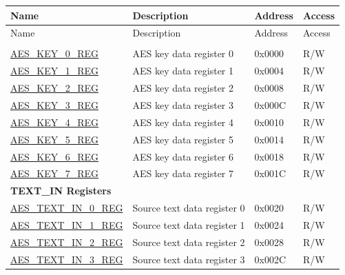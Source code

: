 \begin{longtable}{ | p{5.2cm} | p{6.6cm} | p{2cm} | p{1.2cm} | }
\hline\rowcolor{lightgray}
Name & Description &  Address & Access \\ \hline
\endfirsthead
        \hline
        \rowcolor{lightgray}
       Name & Description &  Address & Access  \\
        \hline
        \endhead
        \endfoot

\multicolumn{4}{|l|}{\textbf{Key Registers}} \\ \hline

\hyperref[regdesc:AESKEYnREG]{AES\_KEY\_0\_REG}				&	AES key data register 0				& 0x0000 & R/W \\ \hline
\hyperref[regdesc:AESKEYnREG]{AES\_KEY\_1\_REG}				&	AES key data register 1				& 0x0004 & R/W \\ \hline
\hyperref[regdesc:AESKEYnREG]{AES\_KEY\_2\_REG}				&	AES key data register 2				& 0x0008 & R/W \\ \hline
\hyperref[regdesc:AESKEYnREG]{AES\_KEY\_3\_REG}				&	AES key data register 3				& 0x000C & R/W \\ \hline
\hyperref[regdesc:AESKEYnREG]{AES\_KEY\_4\_REG}				&	AES key data register 4				& 0x0010 & R/W \\ \hline
\hyperref[regdesc:AESKEYnREG]{AES\_KEY\_5\_REG}				&	AES key data register 5				& 0x0014 & R/W \\ \hline
\hyperref[regdesc:AESKEYnREG]{AES\_KEY\_6\_REG}				&	AES key data register 6				& 0x0018 & R/W \\ \hline
\hyperref[regdesc:AESKEYnREG]{AES\_KEY\_7\_REG}				&	AES key data register 7				& 0x001C & R/W \\ \hline

\multicolumn{4}{|l|}{\textbf{TEXT\_IN Registers}} \\ \hline

\hyperref[regdesc:AESTEXTINnREG]{AES\_TEXT\_IN\_0\_REG}			&	Source text data register 0					& 0x0020 & R/W \\ \hline
\hyperref[regdesc:AESTEXTINnREG]{AES\_TEXT\_IN\_1\_REG}			&	Source text data register 1					& 0x0024 & R/W \\ \hline
\hyperref[regdesc:AESTEXTINnREG]{AES\_TEXT\_IN\_2\_REG}			&	Source text data register 2					& 0x0028 & R/W \\ \hline
\hyperref[regdesc:AESTEXTINnREG]{AES\_TEXT\_IN\_3\_REG}			&	Source text data register 3					& 0x002C & R/W \\ \hline


\end{longtable}

